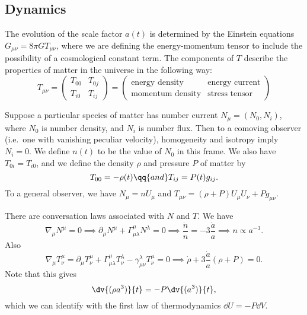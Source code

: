 \documentclass{jknotes}
\begin{document}
\subsection{Dynamics}
The evolution of the scale factor \(a(t)\) is determined by the Einstein equations \(G_{\mu\nu} = 8\pi G T_{\mu\nu}\), where we are defining the energy-momentum tensor to include the possibility of a cosmological constant term. The components of \(T\) describe the properties of matter in the universe in the following way:
\begin{equation}
    T_{\mu\nu} =
    \begin{pmatrix}
        T_{00} & T_{0j} \\
        T_{i0} & T_{ij}
    \end{pmatrix} 
    =
    \begin{pmatrix}
        \text{energy density} & \text{energy current} \\
        \text{momentum density} & \text{stress tensor}
    \end{pmatrix}
\end{equation}

Suppose a particular species of matter has number current \(N_\mu=(N_0,N_i)\), where \(N_0\) is number density, and \(N_i\) is number flux. Then to a comoving observer (i.e.\ one with vanishing peculiar velocity), homogeneity and isotropy imply \(N_i=0\). We define \(n(t)\) to be the value of \(N_0\) in this frame. We also have \(T_{0i}=T_{i0}\), and we define the density \(\rho\) and pressure \(P\) of matter by
\begin{equation}
    T_{00} = -\rho(t) \qq{and} T_{ij} = P(t)g_{ij}.
\end{equation}
To a general observer, we have \(N_\mu = n U_\mu\) and \(T_{\mu\nu} = (\rho+P)U_\mu U_\nu + Pg_{\mu\nu}\). 

There are conversation laws associated with \(N\) and \(T\). We have
\begin{equation}
    \nabla_\mu N^\mu = 0 \implies \partial_\mu N^\mu + \Gamma^\mu_{\mu\lambda} N^\lambda = 0 \implies \frac{\dot{n}}{n} = -3\frac{\dot{a}}{a} \implies n \propto a^{-3}.
\end{equation}
Also
\begin{equation}
    \nabla_\mu T^\mu_\nu = \partial_\mu T^\mu_\nu + \Gamma^\mu_{\mu\lambda}T^\lambda_\nu - \gamma^\lambda_{\mu\nu}T^\mu_\nu = 0 \implies \dot{\rho} + 3\frac{\dot{a}}{a}(\rho+P)=0.
\end{equation}
Note that this gives
\begin{equation}
    \dv{(\rho a^3)}{t} = -P\dv{(a^3)}{t},
\end{equation}
which we can identify with the first law of thermodynamics \(\dd{U}=-P\dd{V}\).
\end{document}
